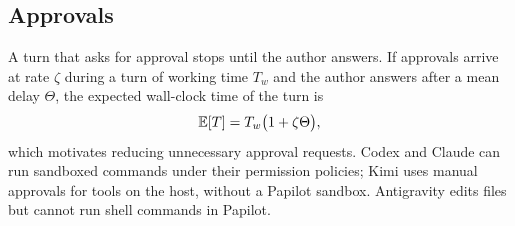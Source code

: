 \subsection{Approvals}

A turn that asks for approval stops until the author answers. If approvals
arrive at rate $\zeta$ during a turn of working time $T_w$ and the author
answers after a mean delay $\Theta$, the expected wall-clock time of the turn is
\begin{equation}
  \mathbb{E}[T] = T_w \bigl(1 + \zeta \Theta\bigr),
  \label{eq:approvals}
\end{equation}
which motivates reducing unnecessary approval requests. Codex and Claude can
run sandboxed commands under their permission policies; Kimi uses manual
approvals for tools on the host, without a Papilot sandbox. Antigravity edits
files but cannot run shell commands in Papilot.
